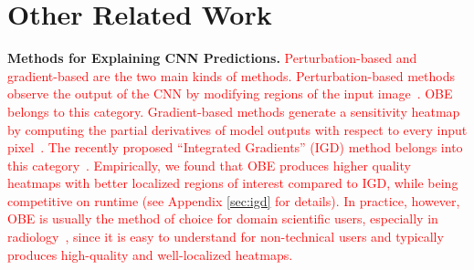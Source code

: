 \documentclass[10pt, sigconf]{acmart}
\newcommand{\red}{\textcolor{red}}
\begin{document}
\vspace{-2mm}
\section{Other Related Work}

\vspace{2mm}
\noindent \textbf{Methods for Explaining CNN Predictions.}
\red{Perturbation-based and gradient-based are the two main kinds of methods. Perturbation-based methods observe the output of the CNN by modifying regions of the input image~\cite{zeiler2014visualizing,zintgraf2017visualizing,ribeiro2016should}. OBE belongs to this category.}
\red{Gradient-based methods generate a sensitivity heatmap by computing the partial derivatives of model outputs with respect to every input pixel~\cite{simonyan2013deep,selvaraju2017grad,sundararajan2017axiomatic}. The recently proposed ``Integrated Gradients'' (IGD) method belongs into this category~\cite{sundararajan2017axiomatic}. Empirically, we found that OBE produces higher quality heatmaps with better localized regions of interest compared to IGD, while being competitive on runtime (see Appendix \ref{sec:igd} for details). In practice, however, OBE is usually the method of choice for domain scientific users, especially in radiology~\cite{jung2017deep,miller2017explanation}, since it is easy to understand for non-technical users and typically produces high-quality and well-localized heatmaps.}


\end{document}
